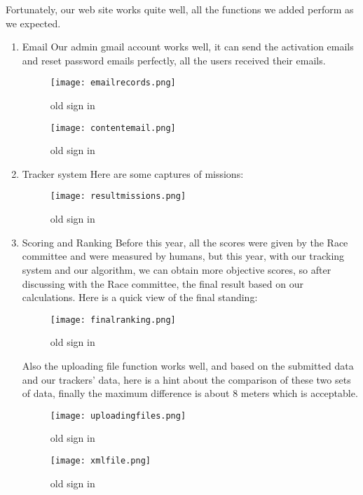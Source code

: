 Fortunately, our web site works quite well, all the functions we added perform as we expected. 
\begin{enumerate}
\item{Email}
Our admin gmail account works well, it can send the activation emails and reset password emails perfectly, all the users received their emails.
\begin{figure}[h!]
\centering
\texttt{[image: emailrecords.png]}
\caption{old sign in }
\label{fig-sample}
\end{figure}

\begin{figure}[h!]
\centering
\texttt{[image: contentemail.png]}
\caption{old sign in }
\label{fig-sample}
\end{figure}
\item{Tracker system}
Here are some captures of missions:
\begin{figure}[h!]
\centering
\texttt{[image: resultmissions.png]}
\caption{old sign in }
\label{fig-sample}
\end{figure}


\item{Scoring and Ranking}
Before this year, all the scores were given by the Race committee and were measured by humans, but this year, with our tracking system and our algorithm, we can obtain more objective scores, so after discussing with the Race committee, the final result based on our calculations. Here is a quick view of the final standing:
\begin{figure}[h!]
\centering
\texttt{[image: finalranking.png]}
\caption{old sign in }
\label{fig-sample}
\end{figure}
Also the uploading file function works well, and based on the submitted data and our trackers' data, here is a hint about the comparison of these two sets of data, finally the maximum difference is about 8 meters which is acceptable.
\begin{figure}[h!]
\centering
\texttt{[image: uploadingfiles.png]}
\caption{old sign in }
\label{fig-sample}
\end{figure}
\begin{figure}[h!]
\centering
\texttt{[image: xmlfile.png]}
\caption{old sign in }
\label{fig-sample}
\end{figure}
\end{enumerate}
